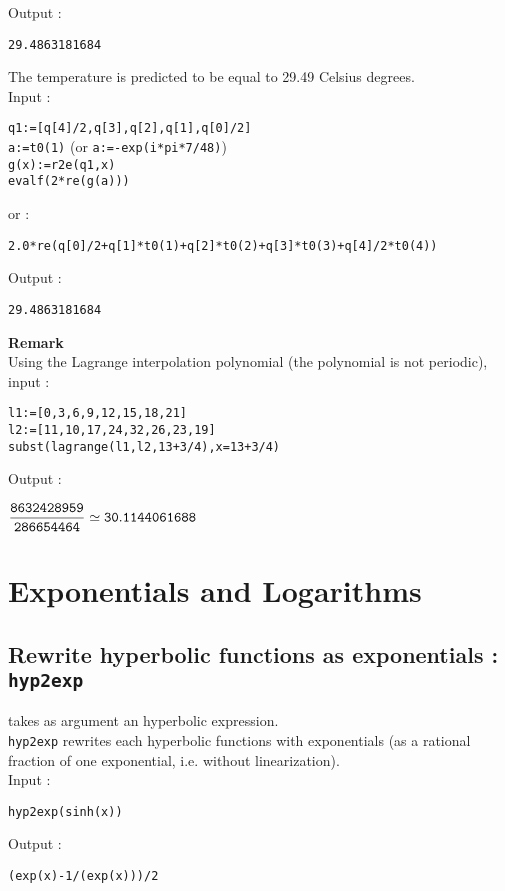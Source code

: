 \documentclass[a4paper,11pt]{book}
\begin{document}
Output :
\begin{center}
{\tt 29.4863181684}
\end{center}
The temperature is predicted to be equal to 29.49 Celsius degrees.\\
Input :
\begin{center}
{\tt q1:=[q[4]/2,q[3],q[2],q[1],q[0]/2]}\\
{\tt a:=t0(1)} (or {\tt a:=-exp(i*pi*7/48)})\\
{\tt g(x):=r2e(q1,x)}\\
{\tt evalf(2*re(g(a)))}
\end{center}
or :
\begin{center}
{\tt 2.0*re(q[0]/2+q[1]*t0(1)+q[2]*t0(2)+q[3]*t0(3)+q[4]/2*t0(4))}
\end{center}
Output :
\begin{center}
{\tt 29.4863181684}
\end{center}

{\bf Remark}\\
Using the Lagrange interpolation polynomial (the polynomial is not periodic),
input :
\begin{center}
{\tt l1:=[0,3,6,9,12,15,18,21]}\\
{\tt l2:=[11,10,17,24,32,26,23,19]}\\
{\tt subst(lagrange(l1,l2,13+3/4),x=13+3/4)}\\
\end{center}
Output :
\begin{center}
${\tt \displaystyle \frac{8632428959}{286654464}\simeq 30.1144061688}$
\end{center}
\section{Exponentials and Logarithms}
\subsection{Rewrite hyperbolic functions as exponentials : {\tt hyp2exp}}
 takes as argument an hyperbolic expression.\\
{\tt hyp2exp} rewrites each hyperbolic functions with exponentials
(as a rational fraction of one exponential,
i.e. {\sc without} linearization).\\ 
Input :
\begin{center}{\tt hyp2exp(sinh(x))}\end{center}
Output :
\begin{center}{\tt (exp(x)-1/(exp(x)))/2}\end{center}
\end{document}
